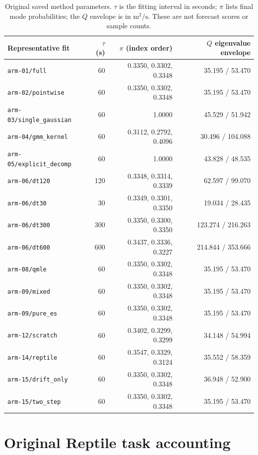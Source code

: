 \begin{table}[htbp]
\centering\footnotesize
\caption{Original saved method parameters. $\tau$ is the fitting interval
in seconds; $\pi$ lists final mode probabilities; the $Q$ envelope is in
$\mathrm{m}^2/\mathrm{s}$. These are not forecast scores or sample counts.}
\label{tab:method-noise-parameters}\hypertarget{tab:method-noise-parameters}{}
\begin{tabular}{lrrr}
\toprule
Representative fit & $\tau$ (s) & $\pi$ (index order) & $Q$ eigenvalue envelope\\
\midrule
\texttt{arm-01/full} & 60 & 0.3350, 0.3302, 0.3348 & 35.195 / 53.470\\
\texttt{arm-02/pointwise} & 60 & 0.3350, 0.3302, 0.3348 & 35.195 / 53.470\\
\texttt{arm-03/single\_gaussian} & 60 & 1.0000 & 45.529 / 51.942\\
\texttt{arm-04/gmm\_kernel} & 60 & 0.3112, 0.2792, 0.4096 & 30.496 / 104.088\\
\texttt{arm-05/explicit\_decomp} & 60 & 1.0000 & 43.828 / 48.535\\
\texttt{arm-06/dt120} & 120 & 0.3348, 0.3314, 0.3339 & 62.597 / 99.070\\
\texttt{arm-06/dt30} & 30 & 0.3349, 0.3301, 0.3350 & 19.034 / 28.435\\
\texttt{arm-06/dt300} & 300 & 0.3350, 0.3300, 0.3350 & 123.274 / 216.263\\
\texttt{arm-06/dt600} & 600 & 0.3437, 0.3336, 0.3227 & 214.844 / 353.666\\
\texttt{arm-08/qmle} & 60 & 0.3350, 0.3302, 0.3348 & 35.195 / 53.470\\
\texttt{arm-09/mixed} & 60 & 0.3350, 0.3302, 0.3348 & 35.195 / 53.470\\
\texttt{arm-09/pure\_es} & 60 & 0.3350, 0.3302, 0.3348 & 35.195 / 53.470\\
\texttt{arm-12/scratch} & 60 & 0.3402, 0.3299, 0.3299 & 34.148 / 54.994\\
\texttt{arm-14/reptile} & 60 & 0.3547, 0.3329, 0.3124 & 35.552 / 58.359\\
\texttt{arm-15/drift\_only} & 60 & 0.3350, 0.3302, 0.3348 & 36.948 / 52.900\\
\texttt{arm-15/two\_step} & 60 & 0.3350, 0.3302, 0.3348 & 35.195 / 53.470\\
\bottomrule
\end{tabular}
\end{table}


\section{Original Reptile task accounting}
\label{sec:reptile-task-accounting}\hypertarget{sec:reptile-task-accounting}{}
